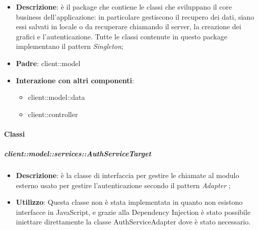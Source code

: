 \begin{itemize}
	\item \textbf{Descrizione}: è il package che contiene le classi che sviluppano il core business dell'applicazione: in particolare gestiscono il recupero dei dati, siano essi salvati in locale o da recuperare chiamando il server, la creazione dei grafici e l'autenticazione. Tutte le classi contenute in questo package implementano il pattern \emph{Singleton};
	\item \textbf{Padre}: client::model
	\item \textbf{Interazione con altri componenti}:
		\begin{itemize}
			\item client::model::data
			\item client::controller
		\end{itemize}
\end{itemize}

	\paragraph{Classi} %

		\subparagraph{client::model::services::AuthServiceTarget} %
		\label{subp:client_model_services_authservice}
			\begin{itemize}
				\item \textbf{Descrizione}: è la classe di interfaccia per gestire le chiamate al modulo esterno usato per gestire l'autenticazione secondo il pattern \emph{Adapter} ;
				\item \textbf{Utilizzo}: Questa classe non è stata implementata in quanto non esistono interfacce in JavaScript, e grazie alla Dependency Injection è stato  possibile iniettare direttamente la classe AuthServiceAdapter dove è stato necessario.
			\end{itemize}

